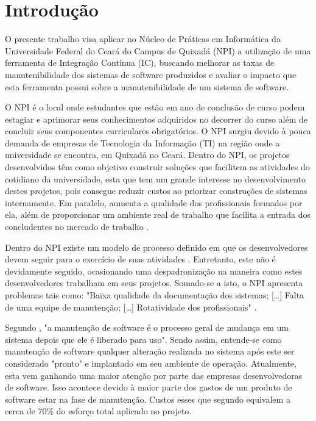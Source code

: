 \chapter{Introdução}

O presente trabalho visa aplicar no Núcleo de Práticas em Informática da Universidade Federal do Ceará do Campus de Quixadá (NPI) a utilização de uma ferramenta de Integração Contínua (IC), buscando melhorar as taxas de manutenibilidade dos sistemas de software produzidos e avaliar o impacto que esta ferramenta possui sobre a manutenibilidade de um sistema de software.

O NPI é o local onde estudantes que estão em ano de conclusão de curso podem estagiar e aprimorar seus conhecimentos adquiridos no decorrer do curso além de concluir seus componentes curriculares obrigatórios. O NPI surgiu devido à pouca demanda de empresas de Tecnologia da Informação (TI) na região onde a universidade se encontra, em Quixadá no Ceará. Dentro do NPI, os projetos desenvolvidos têm como objetivo construir soluções que facilitem as atividades do cotidiano da universidade, esta que tem um grande interesse no desenvolvimento destes projetos, pois consegue reduzir custos ao priorizar construções de sistemas internamente. Em paralelo, aumenta a qualidade dos profissionais formados por ela, além de proporcionar um ambiente real de trabalho que facilita a entrada dos concludentes no mercado de trabalho \cite{npi2013}.

Dentro do NPI existe um modelo de processo definido em que os desenvolvedores devem seguir para o exercício de suas atividades \cite{npi2013}. Entretanto, este não é devidamente seguido, ocasionando uma despadronização na maneira como estes  desenvolvedores trabalham em seus projetos. Somado-se a isto, o NPI apresenta problemas tais como: "Baixa qualidade da documentação dos sistemas; [\ldots] Falta de uma equipe de manutenção; [\ldots] Rotatividade dos profissionais" \cite[p.~4]{paduelli2006}.


Segundo , "a manutenção de software é o processo geral de mudança em um sistema depois que ele é liberado para uso". Sendo assim, entende-se como manutenção de software  qualquer alteração realizada no sistema após este ser considerado "pronto" e implantado em seu ambiente de operação. Atualmente, esta vem ganhando uma maior atenção por parte das empresas desenvolvedoras de software. Isso acontece devido à maior parte dos gastos de um produto de software estar na fase de manutenção. Custos esses que segundo  equivalem a  cerca de 70\% do esforço total aplicado no projeto.

